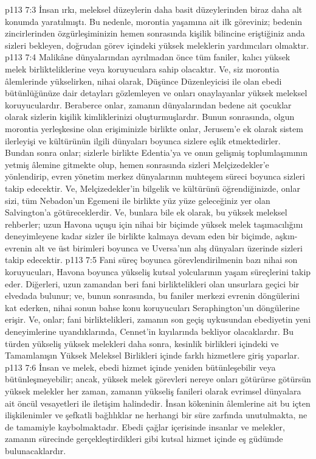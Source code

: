 \vs p113 7:3 İnsan ırkı, meleksel düzeylerin daha basit düzeylerinden biraz daha alt konumda yaratılmıştı. Bu nedenle, morontia yaşamına ait ilk göreviniz; bedenin zincirlerinden özgürleşiminizin hemen sonrasında kişilik bilincine eriştiğiniz anda sizleri bekleyen, doğrudan görev içindeki yüksek meleklerin yardımcıları olmaktır.
\vs p113 7:4 Malikâne dünyalarından ayrılmadan önce tüm faniler, kalıcı yüksek melek birlikteliklerine veya koruyuculara sahip olacaktır. Ve, siz morontia âlemlerinde yükselirken, nihai olarak, Düşünce Düzenleyicisi ile olan ebedi bütünlüğünüze dair detayları gözlemleyen ve onları onaylayanlar yüksek meleksel koruyuculardır. Beraberce onlar, zamanın dünyalarından bedene ait çocuklar olarak sizlerin kişilik kimliklerinizi oluşturmuşlardır. Bunun sonrasında, olgun morontia yerleşkesine olan erişiminizle birlikte onlar, Jerusem’e ek olarak sistem ilerleyişi ve kültürünün ilgili dünyaları boyunca sizlere eşlik etmektedirler. Bundan sonra onlar; sizlerle birlikte Edentia’ya ve onun gelişmiş toplumlaşımının yetmiş âlemine gitmekte olup, hemen sonrasında sizleri Melçizedekler’e yönlendirip, evren yönetim merkez dünyalarının muhteşem süreci boyunca sizleri takip edecektir. Ve, Melçizedekler’in bilgelik ve kültürünü öğrendiğinizde, onlar sizi, tüm Nebadon’un Egemeni ile birlikte yüz yüze geleceğiniz yer olan Salvington’a götüreceklerdir. Ve, bunlara bile ek olarak, bu yüksek meleksel rehberler; uzun Havona uçuşu için nihai bir biçimde yüksek melek taşımacılığını deneyimleyene kadar sizler ile birlikte kalmaya devam eden bir biçimde, aşkın\hyp{}evrenin alt ve üst birimleri boyunca ve Uversa’nın alış dünyaları üzerinde sizleri takip edecektir.
\vs p113 7:5 Fani süreç boyunca görevlendirilmenin bazı nihai son koruyucuları, Havona boyunca yükseliş kutsal yolcularının yaşam süreçlerini takip eder. Diğerleri, uzun zamandan beri fani birliktelikleri olan unsurlara geçici bir elvedada bulunur; ve, bunun sonrasında, bu faniler merkezi evrenin döngülerini kat ederken, nihai sonun bahse konu koruyucuları Seraphington’un döngülerine erişir. Ve, onlar; fani birliktelikleri, zamanın son geçiş uykusundan ebediyetin yeni deneyimlerine uyandıklarında, Cennet’in kıyılarında bekliyor olacaklardır. Bu türden yükseliş yüksek melekleri daha sonra, kesinlik birlikleri içindeki ve Tamamlanışın Yüksek Meleksel Birlikleri içinde farklı hizmetlere giriş yaparlar.
\vs p113 7:6 İnsan ve melek, ebedi hizmet içinde yeniden bütünleşebilir veya bütünleşmeyebilir; ancak, yüksek melek görevleri nereye onları götürürse götürsün yüksek melekler her zaman, zamanın yükseliş fanileri olarak evrimsel dünyalara ait öncül vesayetleri ile iletişim halindedir. İnsan kökeninin âlemlerine ait bu içten ilişkilenimler ve şefkatli bağlılıklar ne herhangi bir süre zarfında unutulmakta, ne de tamamiyle kaybolmaktadır. Ebedi çağlar içerisinde insanlar ve melekler, zamanın sürecinde gerçekleştirdikleri gibi kutsal hizmet içinde eş güdümde bulunacaklardır.
